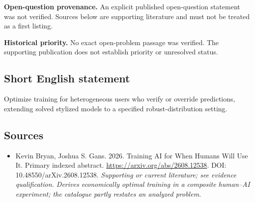 \documentclass[11pt]{article}
\begin{document}
\par\textbf{Open-question provenance.} An explicit published open-question statement was not verified. Sources below are supporting literature and must not be treated as a first listing.

\par\textbf{Historical priority.} No exact open-problem passage was verified. The supporting publication does not establish priority or unresolved status.

\subsection{Short English statement}
Optimize training for heterogeneous users who verify or override predictions, extending solved stylized models to a specified robust-distribution setting.

\subsection{Sources}
\begin{itemize}\raggedright
\item[\textnormal{[S1]}]\hypertarget{source:30007700:1}{} Kevin Bryan, Joshua S. Gans. 2026. Training AI for When Humans Will Use It. Primary indexed abstract.
\url{https://arxiv.org/abs/2608.12538}.
DOI: 10.48550/arXiv.2608.12538.
{\small\textit{Supporting or current literature; see evidence qualification. Derives economically optimal training in a composite human–AI experiment; the catalogue partly restates an analyzed problem.}}
\end{itemize}
\end{document}
